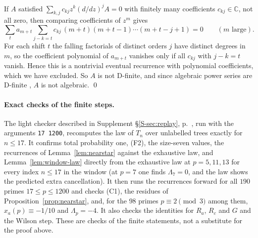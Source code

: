 \documentclass[11pt]{article}
\theoremstyle{remark}
\newcommand{\Sref}[1]{Supplement \S\ref{S-#1}, p.~\pageref{S-#1}}
\begin{document}
If $A$ satisfied $\sum_{k,j}c_{kj}z^k(d/dz)^jA=0$ with finitely many coefficients $c_{kj}\in\mathbb C$, not all zero, then comparing coefficients of $z^m$ gives
\[
 \sum_t a_{m+t}\sum_{j-k=t}c_{kj}\,(m+t)(m+t-1)\cdots(m+t-j+1)=0\qquad(m\text{ large}).
\]
For each shift $t$ the falling factorials of distinct orders $j$ have distinct degrees in $m$, so the coefficient polynomial of $a_{m+t}$ vanishes only if all $c_{kj}$ with $j-k=t$ vanish. Hence this is a nontrivial eventual recurrence with polynomial coefficients, which we have excluded. So $A$ is not D-finite, and since algebraic power series are D-finite \cite{Stanley}, $A$ is not algebraic. \qed

\paragraph{Exact checks of the finite steps.} The light checker described in \Sref{sec:replay}, run with the arguments \texttt{17 1200}, recomputes the law of $T_n$ over unlabelled trees exactly for $n\le17$. It confirms total probability one, (F2), the size-seven values, the recurrences of Lemma~\ref{lem:nearstar} against the exhaustive law, and Lemma~\ref{lem:window-law} directly from the exhaustive law at $p=5,11,13$ for every index $n\le17$ in the window (at $p=7$ one finds $\Lambda_7=0$, and the law shows the predicted extra cancellation). It then runs the recurrences forward for all $190$ primes $17\le p\le1200$ and checks (C1), the residues of Proposition~\ref{prop:nearstar}, and, for the $98$ primes $p\equiv2\pmod3$ among them, $x_a(p)\equiv-1/10$ and $\Lambda_p=-4$. It also checks the identities for $R_a$, $R_c$ and $G$ and the Wilson step. These are checks of the finite statements, not a substitute for the proof above.
\end{document}
